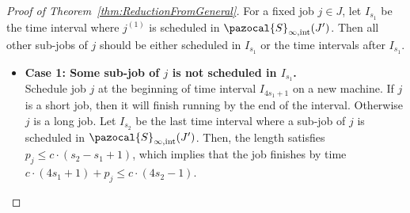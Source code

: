 \begin{proof}[Proof of Theorem~\ref{thm:ReductionFromGeneral}]
  For a fixed job $j \in J$, let $I_{s_1}$ be the time interval where $j^{(1)}$ is scheduled in $\pazocal{S}_{\infty,\text{int}}(J')$. 
  Then all other sub-jobs of $j$ should be either scheduled in $I_{s_1}$ or the time intervals after $I_{s_1}$. 
\begin{itemize}	
	\item {\bf Case 1: Some sub-job of $j$ is not scheduled in $I_{s_1}$.}\\
  Schedule job $j$ at the beginning of time interval $I_{4{s_1}+1}$ on a new machine.
  If $j$ is a short job, then it will finish running by the end of the interval. 
  Otherwise $j$ is a long job.
  Let $I_{s_2}$ be the last time interval where a sub-job of $j$ is scheduled in $\pazocal{S}_{\infty,\text{int}}(J')$. 
  Then, the length satisfies $p_j \le c\cdot (s_2-s_1+1)$, 
  which implies that the job finishes by time $c\cdot (4s_1+1)+p_j\le c\cdot(4s_2-1)$.
	

\end{itemize}
\end{proof}
